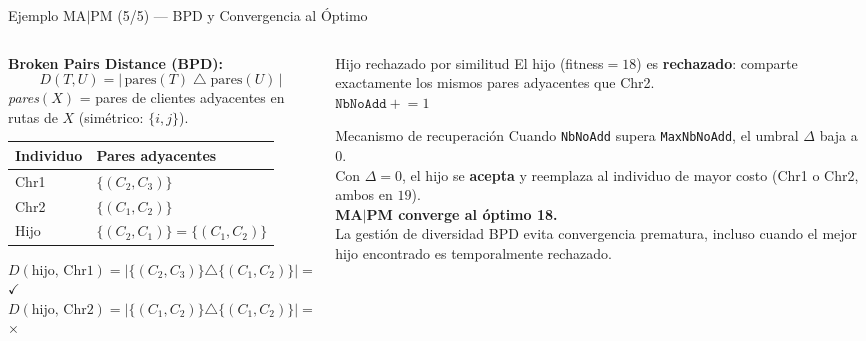 \documentclass[aspectratio=169,10pt]{beamer}
\begin{document}
\begin{frame}{Ejemplo MA$|$PM (5/5) --- BPD y Convergencia al Óptimo}
  \begin{columns}[T,onlytextwidth]
    \begin{column}{0.50\textwidth}
      \textbf{Broken Pairs Distance (BPD):}
      \[
        D(T,U) = |\,\text{pares}(T) \mathbin{\triangle} \text{pares}(U)\,|
      \]
      \footnotesize
      \textit{pares}$(X)$ = pares de clientes adyacentes en rutas de $X$ (simétrico: $\{i,j\}$).
      \vspace{0.3em}
      \begin{center}\footnotesize
      \begin{tabular}{ll}
        \toprule
        Individuo & Pares adyacentes \\
        \midrule
        Chr1 & $\{(C_2,C_3)\}$ \\
        Chr2 & $\{(C_1,C_2)\}$ \\
        Hijo & $\{(C_2,C_1)\}=\{(C_1,C_2)\}$ \\
        \bottomrule
      \end{tabular}
      \end{center}
      \vspace{0.3em}
      \footnotesize
      $D(\text{hijo, Chr1}) = |\{(C_2,C_3)\}\triangle\{(C_1,C_2)\}| = 2 \ge \Delta{=}1$
      \quad $\checkmark$\\[0.3em]
      $D(\text{hijo, Chr2}) = |\{(C_1,C_2)\}\triangle\{(C_1,C_2)\}| = 0 < \Delta{=}1$
      \quad $\times$
    \end{column}
    \begin{column}{0.48\textwidth}
      \begin{alertblock}{Hijo rechazado por similitud}\small
        El hijo (fitness$=18$) es \textbf{rechazado}: comparte exactamente los mismos pares adyacentes que Chr2.\\[0.2em]
        $\texttt{NbNoAdd} \mathrel{+}= 1$
      \end{alertblock}

      \vspace{0.4em}
      \begin{block}{Mecanismo de recuperación}\small
        Cuando \texttt{NbNoAdd} supera \texttt{MaxNbNoAdd}, el umbral $\Delta$ baja a $0$.\\[0.3em]
        Con $\Delta{=}0$, el hijo se \textbf{acepta} y reemplaza al individuo de mayor costo (Chr1 o Chr2, ambos en $19$).\\[0.3em]
        \textbf{MA$|$PM converge al óptimo 18.}\\[0.2em]
        La gestión de diversidad BPD evita convergencia prematura, incluso cuando el mejor hijo encontrado es temporalmente rechazado.
      \end{block}
    \end{column}
  \end{columns}
\end{frame}
\end{document}
